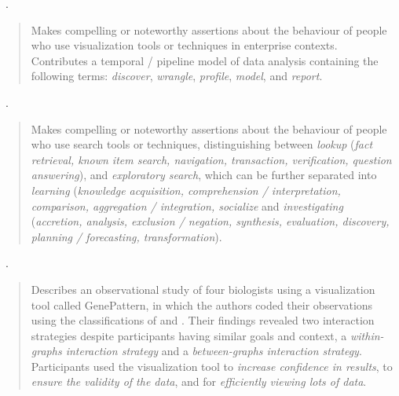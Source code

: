 \begin{sloppypar}
~\cite{Kandel2012}. \end{sloppypar}

\begin{quotation}
    Makes compelling or noteworthy assertions about the behaviour of people who use visualization tools or techniques in enterprise contexts.
    Contributes a temporal / pipeline model of data analysis containing the following terms: {\it discover}, {\it wrangle}, {\it profile}, {\it model}, and {\it report}.
\end{quotation}

\begin{sloppypar}
~\cite{Marchionini2006}. \end{sloppypar}

\begin{quotation}
    Makes compelling or noteworthy assertions about the behaviour of people who use search tools or techniques, distinguishing between {\it lookup} ({\it fact retrieval, known item search, navigation, transaction, verification, question answering}), and {\it exploratory search}, which can be further separated into {\it learning} ({\it knowledge acquisition, comprehension / interpretation, comparison, aggregation / integration, socialize} and {\it investigating} ({\it accretion, analysis, exclusion / negation, synthesis, evaluation, discovery, planning / forecasting, transformation}).
\end{quotation}

\begin{sloppypar}
~\cite{Ziemkiewicz2012}. \end{sloppypar}

\begin{quotation}
    Describes an observational study of four biologists using a visualization tool called GenePattern, in which the authors coded their observations using the classifications of \citet{Springmeyer1992} and \citet{Amar2005}.
    Their findings revealed two interaction strategies despite participants having similar goals and context, a {\it within-graphs interaction strategy} and a {\it between-graphs interaction strategy}. 
    Participants used the visualization tool to {\it increase confidence in results}, to {\it ensure the validity of the data}, and for {\it efficiently viewing lots of data}. 
\end{quotation}

